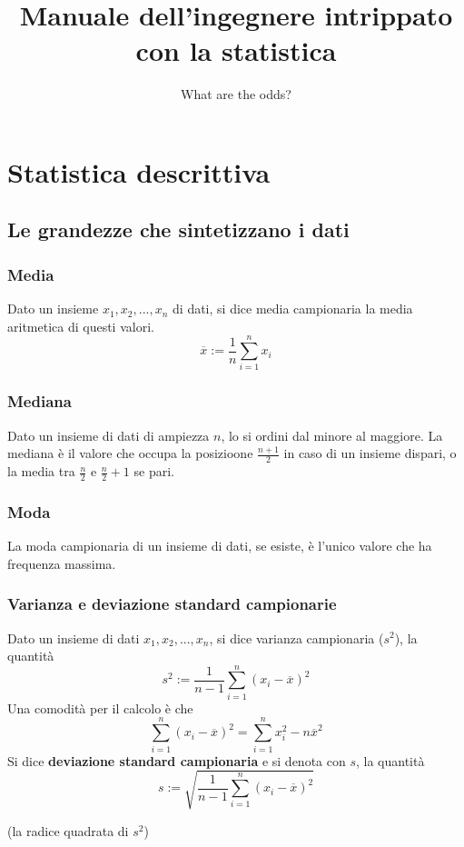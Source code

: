 \documentclass[11pt]{article}
\begin{document}
\author{What are the odds?}
\title{Manuale dell'ingegnere intrippato con la statistica}

\maketitle

\medskip
\section{Statistica descrittiva}
\subsection{Le grandezze che sintetizzano i dati}
\subsubsection{Media}
Dato un insieme $x_1,x_2,...,x_n$ di dati, si dice media campionaria la media aritmetica di questi valori.
\begin{displaymath}
\overline{x}:=\frac{1}{n}\sum_{i=1}^{n}x_i
\end{displaymath}
\subsubsection{Mediana}
Dato un insieme di dati di ampiezza $n$, lo si ordini dal minore al maggiore. La mediana è il valore che occupa la posizioone $\frac{n+1}{2}$ in caso di un insieme dispari, o la media tra $\frac{n}{2}$ e $\frac{n}{2}+1$ se pari.
\subsubsection{Moda}
La moda campionaria di un insieme di dati, se esiste, è l'unico valore che ha frequenza massima.
\subsubsection{Varianza e deviazione standard campionarie}
Dato un insieme di dati $x_1,x_2,...,x_n$, si dice varianza campionaria ($s^2$), la quantità
\begin{displaymath}
s^2:=\frac{1}{n-1}\sum_{i=1}^{n}(x_i-\overline{x})^2
\end{displaymath}
Una comodità per il calcolo è che 
\begin{displaymath}
\sum_{i=1}^{n}(x_i-\overline{x})^2 = \sum_{i=1}^{n}x_i^2-n\overline{x}^2
\end{displaymath}
Si dice \textbf{deviazione standard campionaria} e si denota con $s$, la quantità
\begin{displaymath}
s:=\sqrt{\frac{1}{n-1}\sum_{i=1}^{n}(x_i-\overline{x})^2}
\end{displaymath}
\begin{center}
    (la radice quadrata di $s^2$)
\end{center}
\end{document}
